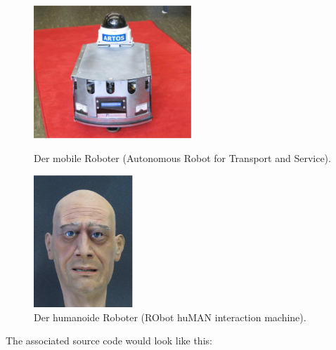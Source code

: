 \begin{figure}
  \begin{center}
    \begin{minipage}{0.48\textwidth}
      \begin{center}
        \includegraphics[height=5cm]{images/roter_teppich}
        \caption{Der mobile Roboter \RRLABartos (Autonomous Robot for Transport and Service).}
        \label{fig:ARTOS}
      \end{center}
    \end{minipage}
    \hspace{0.02\textwidth}
    \begin{minipage}{0.48\textwidth}
      \begin{center}
        \includegraphics[height=5cm]{images/roman_mask}
        \caption{Der humanoide Roboter \RRLABroman (RObot huMAN interaction machine).}
        \label{fig:ROMAN}
      \end{center}
    \end{minipage}
  \end{center}
\end{figure}

The associated source code would look like this:

